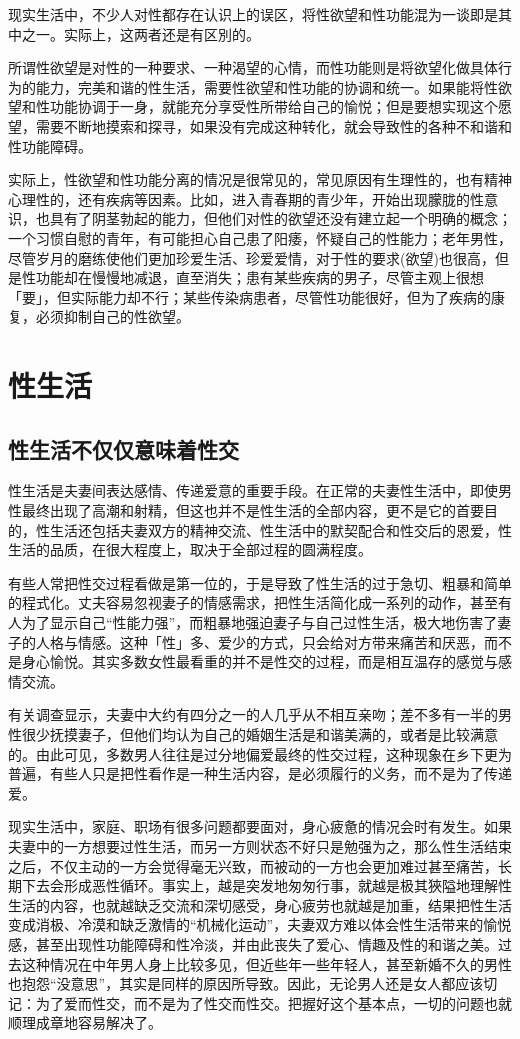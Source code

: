 \documentclass[12pt,UTF8]{ctexbook}
\begin{document}
现实生活中，不少人对性都存在认识上的误区，将性欲望和性功能混为一谈即是其中之一。实际上，这两者还是有区別的。

所谓性欲望是对性的一种要求、一种渴望的心情，而性功能则是将欲望化做具体行为的能力，完美和谐的性生活，需要性欲望和性功能的协调和统一。如果能将性欲望和性功能协调于一身，就能充分享受性所带给自己的愉悦；但是要想实现这个愿望，需要不断地摸索和探寻，如果没有完成这种转化，就会导致性的各种不和谐和性功能障碍。

实际上，性欲望和性功能分离的情况是很常见的，常见原因有生理性的，也有精神心理性的，还有疾病等因素。比如，进入青春期的青少年，开始出现朦胧的性意识，也具有了阴茎勃起的能力，但他们对性的欲望还没有建立起一个明确的概念；一个习惯自慰的青年，有可能担心自己患了阳痿，怀疑自己的性能力；老年男性，尽管岁月的磨练使他们更加珍爱生活、珍爱爱情，对于性的要求(欲望)也很高，但是性功能却在慢慢地减退，直至消失；患有某些疾病的男子，尽管主观上很想「要」，但实际能力却不行；某些传染病患者，尽管性功能很好，但为了疾病的康复，必须抑制自己的性欲望。

\part{性生活}

\chapter{性生活不仅仅意味着性交}

性生活是夫妻间表达感情、传递爱意的重要手段。在正常的夫妻性生活中，即使男性最终出现了高潮和射精，但这也并不是性生活的全部内容，更不是它的首要目的，性生活还包括夫妻双方的精神交流、性生活中的默契配合和性交后的恩爱，性生活的品质，在很大程度上，取决于全部过程的圆满程度。

有些人常把性交过程看做是第一位的，于是导致了性生活的过于急切、粗暴和简单的程式化。丈夫容易忽视妻子的情感需求，把性生活简化成一系列的动作，甚至有人为了显示自己“性能力强”，而粗暴地强迫妻子与自己过性生活，极大地伤害了妻子的人格与情感。这种「性」多、爱少的方式，只会给对方带来痛苦和厌恶，而不是身心愉悦。其实多数女性最看重的并不是性交的过程，而是相互温存的感觉与感情交流。

有关调查显示，夫妻中大约有四分之一的人几乎从不相互亲吻；差不多有一半的男性很少抚摸妻子，但他们均认为自己的婚姻生活是和谐美满的，或者是比较满意的。由此可见，多数男人往往是过分地偏爱最终的性交过程，这种现象在乡下更为普遍，有些人只是把性看作是一种生活内容，是必须履行的义务，而不是为了传递爱。

现实生活中，家庭、职场有很多问题都要面对，身心疲惫的情况会时有发生。如果夫妻中的一方想要过性生活，而另一方则状态不好只是勉强为之，那么性生活结束之后，不仅主动的一方会觉得毫无兴致，而被动的一方也会更加难过甚至痛苦，长期下去会形成恶性循环。事实上，越是突发地匆匆行事，就越是极其狹隘地理解性生活的内容，也就越缺乏交流和深切感受，身心疲劳也就越是加重，结果把性生活变成消极、冷漠和缺乏激情的“机械化运动”，夫妻双方难以体会性生活带来的愉悦感，甚至出现性功能障碍和性冷淡，并由此丧失了爱心、情趣及性的和谐之美。过去这种情况在中年男人身上比较多见，但近些年一些年轻人，甚至新婚不久的男性也抱怨“没意思”，其实是同样的原因所导致。因此，无论男人还是女人都应该切记：为了爱而性交，而不是为了性交而性交。把握好这个基本点，一切的问题也就顺理成章地容易解决了。
\end{document}
